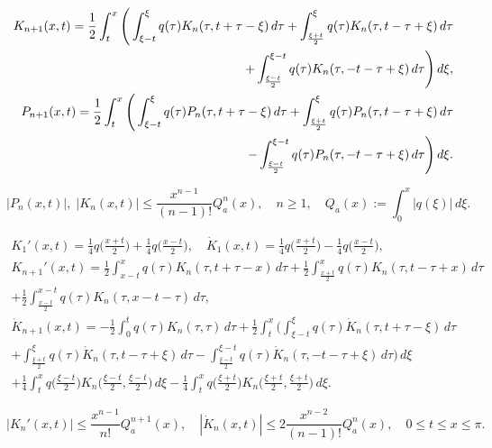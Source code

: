 \documentclass[10pt,a4paper]{amsart}
\begin{document}
\begin{equation} \label{K_{n+1}}
\begin{split}
K_{n+1}(x,t)=\frac{1}{2}\int_t^x
\Bigg( \int_{\xi-t}^\xi q(\tau)K_n(\tau,t+\tau-\xi)\,d\tau +\int_{\frac{\xi+t}{2}}^\xi q(\tau)K_n(\tau,t-\tau+\xi)\,d\tau
\\
+\int_{\frac{\xi-t}{2}}^{\xi-t}
q(\tau)K_n(\tau,-t-\tau+\xi)\,d\tau \Bigg)\,d\xi,
\\
P_{n+1}(x,t)=\frac{1}{2}\int_t^x
\Bigg( \int_{\xi-t}^\xi q(\tau)P_n(\tau,t+\tau-\xi)\,d\tau +\int_{\frac{\xi+t}{2}}^\xi q(\tau)P_n(\tau,t-\tau+\xi)\,d\tau
\\
-
\int_{\frac{\xi-t}{2}}^{\xi-t}q(\tau)
P_n(\tau,-t-\tau+\xi)\,d\tau \Bigg)\,d\xi.
\end{split}
\end{equation}

\begin{equation}\label{K_n}
|P_n(x,t)|, \; |K_n(x,t)|\le \frac{x^{n-1}}{(n-1)!} Q^n_a(x), \quad n \ge 1, \quad Q_a(x) := \int_0^x |q(\xi)|\,d\xi.
\end{equation}

\begin{equation} \label{first der}
\begin{split}
K_1'(x,t) = \frac{1}{4} q\Big(\frac{x+t}{2}\Big) + \frac{1}{4}q\Big(\frac{x-t}{2}\Big),
\quad {\dot K}_1(x, t) = \frac14 q\Big(\frac{x+t}{2}\Big) - \frac14 q\Big(\frac{x-t}{2}\Big),
\\[2mm]
K_{n+1}'(x, t) = \frac12 \int_{x-t}^x q(\tau) K_n(\tau, t + \tau - x) \,d\tau + \frac12 \int_{\frac{x+t}{2}}^x q(\tau) K_n(\tau, t-\tau+x)\,d\tau \\
+\frac12 \int_{\frac{x-t}{2}}^{x-t} q(\tau) K_n(\tau,x-t-\tau)\,d\tau,
\\
{\dot K}_{n+1}(x, t) = -\frac{1}{2} \int_0^t q(\tau) K_n(\tau, \tau) \, d\tau +\frac12 \int_t^x \Bigg(\int_{\xi-t}^\xi q(\tau){\dot K}_n(\tau, t+\tau-\xi)\,d\tau \\
+\int_{\frac{\xi+t}{2}}^\xi q(\tau){\dot K}_n(\tau, t-\tau+\xi)\,d\tau 
- \int_{\frac{\xi-t}{2}}^{\xi-t} q(\tau){\dot K}_n(\tau, -t-\tau+\xi)\,d\tau\Bigg)\,d\xi \\
+ \frac{1}{4} \int_t^x q\Big(\frac{\xi-t}{2}\Big) K_n\Big(\frac{\xi-t}{2},\frac{\xi-t}{2}\Big) \,d\xi
- \frac{1}{4} \int_t^x q\Big(\frac{\xi+t}{2}\Big) K_n\Big(\frac{\xi+t}{2},\frac{\xi+t}{2}\Big)\, d\xi.
\end{split}
\end{equation}

\begin{equation} \label{K' est}
|K_{n}'(x, t)| \le \frac{x^{n-1}}{n!}Q_a^{n+1}(x), \quad |\dot K_{n}(x, t)| \le 2 \frac{x^{n-2}}{(n-1)!}Q^{n}_a(x), \quad 0 \le t \le x \le \pi.
\end{equation}
\end{document}
